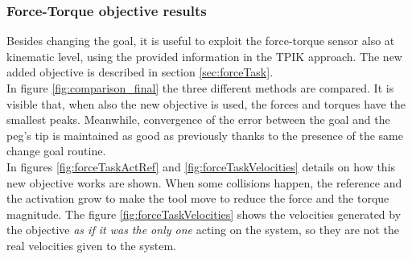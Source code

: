 \subsubsection{Force-Torque objective results}
Besides changing the goal, it is useful to exploit the force-torque sensor also at kinematic level, using the provided information in the TPIK approach. The new added objective is described in section \ref{sec:forceTask}.\\
In figure \ref{fig:comparison_final} the three different methods are compared. It is visible that, when also the new objective is used, the forces and torques have the smallest peaks. Meanwhile, convergence of the error between the goal and the peg's tip is maintained as good as previously thanks to the presence of the same change goal routine.\\
In figures \ref{fig:forceTaskActRef} and \ref{fig:forceTaskVelocities} details on how this new objective works are shown. When some collisions happen, the reference and the activation grow to make the tool move to reduce the force and the torque magnitude. The figure \ref{fig:forceTaskVelocities} shows the velocities generated by the objective \textit{as if it was the only one} acting on the system, so they are not the real velocities given to the system.

